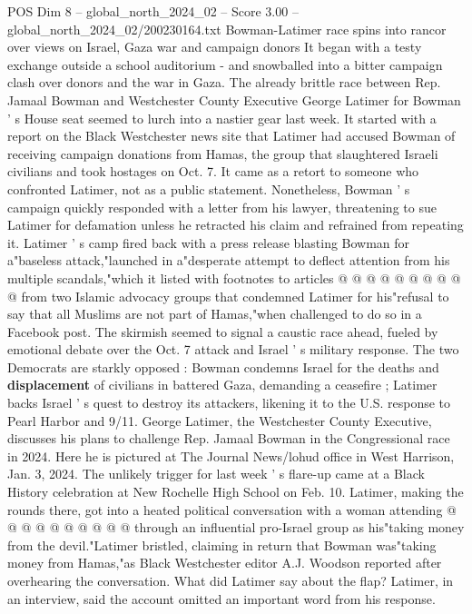 \begin{textsample}{POS Dim 8 – global\_north\_2024\_02 – Score 3.00 – global\_north\_2024\_02/200230164.txt}  \label{ex:f8_pos_220}
Bowman-Latimer race spins into rancor over views on Israel, Gaza war and campaign donors It began with a testy exchange outside a school auditorium - and snowballed into a bitter campaign clash over donors and the war in Gaza.
The already brittle race between Rep.
Jamaal Bowman and Westchester County Executive George Latimer for Bowman ' s House seat seemed to lurch into a nastier gear last week.
It started with a report on the Black Westchester news site that Latimer had accused Bowman of receiving campaign donations from Hamas, the group that slaughtered Israeli civilians and took hostages on Oct. 7.
It came as a retort to someone who confronted Latimer, not as a public statement.
Nonetheless, Bowman ' s campaign quickly responded with a letter from his lawyer, threatening to sue Latimer for defamation unless he retracted his claim and refrained from repeating it.
Latimer ' s camp fired back with a press release blasting Bowman for a"baseless attack,"launched in a"desperate attempt to deflect attention from his multiple scandals,"which it listed with footnotes to articles @ @ @ @ @ @ @ @ @ @ from two Islamic advocacy groups that condemned Latimer for his"refusal to say that all Muslims are not part of Hamas,"when challenged to do so in a Facebook post.
The skirmish seemed to signal a caustic race ahead, fueled by emotional debate over the Oct. 7 attack and Israel ' s military response.
The two Democrats are starkly opposed : Bowman condemns Israel for the deaths and \textbf{displacement} of civilians in battered Gaza, demanding a ceasefire ; Latimer backs Israel ' s quest to destroy its attackers, likening it to the U.S. response to Pearl Harbor and 9/11.
George Latimer, the Westchester County Executive, discusses his plans to challenge Rep.
Jamaal Bowman in the Congressional race in 2024.
Here he is pictured at The Journal News/lohud office in West Harrison, Jan. 3, 2024.
The unlikely trigger for last week ' s flare-up came at a Black History celebration at New Rochelle High School on Feb. 10.
Latimer, making the rounds there, got into a heated political conversation with a woman attending @ @ @ @ @ @ @ @ @ @ through an influential pro-Israel group as his"taking money from the devil."Latimer bristled, claiming in return that Bowman was"taking money from Hamas,"as Black Westchester editor A.J.
Woodson reported after overhearing the conversation.
What did Latimer say about the flap?
Latimer, in an interview, said the account omitted an important word from his response.

\end{textsample}
